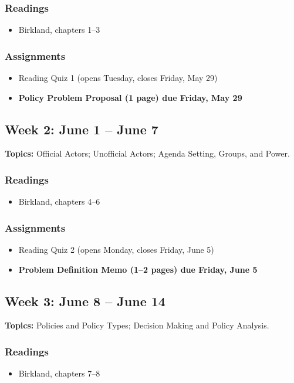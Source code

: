 \documentclass[12pt]{article}
\begin{document}
\subsubsection*{Readings}
    \begin{itemize}
        \item Birkland, chapters 1--3
    \end{itemize}
\subsubsection*{Assignments}
    \begin{itemize}
        \item Reading Quiz 1 (opens Tuesday, closes Friday, May 29)
        \item \textbf{Policy Problem Proposal (1 page) due Friday, May 29}
    \end{itemize}

\subsection*{Week 2: June 1 -- June 7}
\noindent \textbf{Topics:} Official Actors; Unofficial Actors; Agenda Setting, Groups, and Power.
\subsubsection*{Readings}
    \begin{itemize}
        \item Birkland, chapters 4--6
    \end{itemize}
\subsubsection*{Assignments}
    \begin{itemize}
        \item Reading Quiz 2 (opens Monday, closes Friday, June 5)
        \item \textbf{Problem Definition Memo (1--2 pages) due Friday, June 5}
    \end{itemize}

\subsection*{Week 3: June 8 -- June 14}
\noindent \textbf{Topics:} Policies and Policy Types; Decision Making and Policy Analysis.
\subsubsection*{Readings}
    \begin{itemize}
        \item Birkland, chapters 7--8
    \end{itemize}
\end{document}
